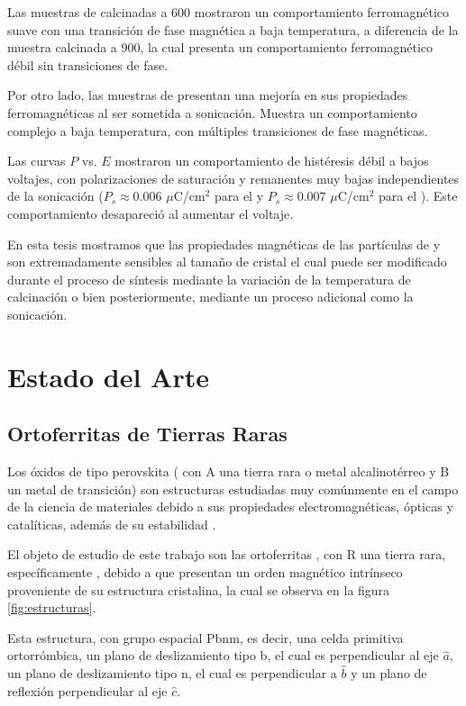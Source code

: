\documentclass[../main.tex]{subfiles}
\begin{document}
Las muestras de \neod{} calcinadas a 600\gradoC{} mostraron un comportamiento ferromagnético suave con una transición de fase magnética a baja temperatura, a diferencia de la muestra calcinada a 900\gradoC{}, la cual presenta un comportamiento ferromagnético débil sin transiciones de fase.

Por otro lado, las muestras de \sama{} presentan una mejoría en sus propiedades ferromagnéticas al ser sometida a sonicación. Muestra un comportamiento complejo a baja temperatura, con múltiples transiciones de fase magnéticas.

Las curvas $P$ vs. $E$ mostraron un comportamiento de histéresis débil a bajos voltajes, con polarizaciones de saturación y remanentes muy bajas independientes de la sonicación ($P_s\approx 0.006$ $\mu$C/cm$^2$ para el \neod{} y $P_s\approx 0.007$ $\mu$C/cm$^2$ para el \sama{}). Este comportamiento desapareció al aumentar el voltaje.

En esta tesis mostramos que las propiedades magnéticas de las partículas de \neod{} y \sama{} son extremadamente sensibles al tamaño de cristal el cual puede ser modificado durante el proceso de síntesis mediante la variación de la temperatura de calcinación o bien posteriormente, mediante un proceso adicional como la sonicación.
\chapter{Estado del Arte}
\section{Ortoferritas de Tierras Raras}
Los óxidos de tipo perovskita ( con A una tierra rara o metal alcalinotérreo y B un metal de transición) son estructuras estudiadas muy comúnmente en el campo de la ciencia de materiales debido a sus propiedades electromagnéticas, ópticas y catalíticas, además de su estabilidad \cite{Wang2019}.

El objeto de estudio de este trabajo son las ortoferritas , con R una tierra rara, específicamente , debido a que presentan un orden magnético intrínseco proveniente de su estructura cristalina, la cual se observa en la figura \ref{fig:estructuras}. 

Esta estructura, con grupo espacial Pbnm, es decir, una celda primitiva ortorrómbica, un plano de deslizamiento tipo b, el cual es perpendicular al eje $\hat{a}$, un plano de deslizamiento tipo n, el cual es perpendicular a $\hat{b}$ y un plano de reflexión perpendicular al eje $\hat{c}$.
\end{document}
